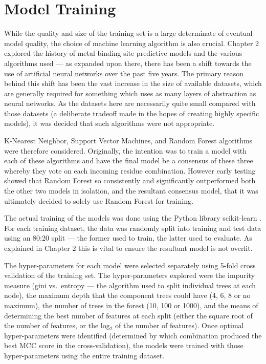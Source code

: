 \section{Model Training}

While the quality and size of the training set is a large determinate of eventual model quality, the choice of machine learning algorithm is also crucial. Chapter 2 explored the history of metal binding site predictive models and the various algorithms used --- as expanded upon there, there has been a shift towards the use of artificial neural networks over the past five years. The primary reason behind this shift has been the vast increase in the size of available datasets, which are generally required for something which uses as many layers of abstraction as neural networks. As the datasets here are necessarily quite small compared with those datasets (a deliberate tradeoff made in the hopes of creating highly specific models), it was decided that such algorithms were not appropriate.

K-Nearest Neighbor, Support Vector Machines, and Random Forest algorithms were therefore considered. Originally, the intention was to train a model with each of these algorithms and have the final model be a consensus of these three whereby they vote on each incoming residue combination. However early testing showed that Random Forest so consistently and significantly outperformed both the other two models in isolation, and the resultant consensus model, that it was ultimately decided to solely use Random Forest for training.

The actual training of the models was done using the Python library scikit-learn \cite{scikit-learn}. For each training dataset, the data was randomly split into training and test data using an 80:20 split --- the former used to train, the latter used to evaluate. As explained in Chapter 2 this is vital to ensure the resultant model is not overfit.

The hyper-parameters for each model were selected separately using 5-fold cross validation of the training set. The hyper-parameters explored were the impurity measure (gini vs.\ entropy --- the algorithm used to split individual trees at each node), the maximum depth that the component trees could have (4, 6, 8 or no maximum), the number of trees in the forest (10, 100 or 1000), and the means of determining the best number of features at each split (either the
square root of the number of features, or the log$_2$ of the number of features). Once optimal hyper-parameters were identified (determined by which combination produced the best MCC score in the cross-validation), the models were trained with those hyper-parameters using the entire training dataset.

